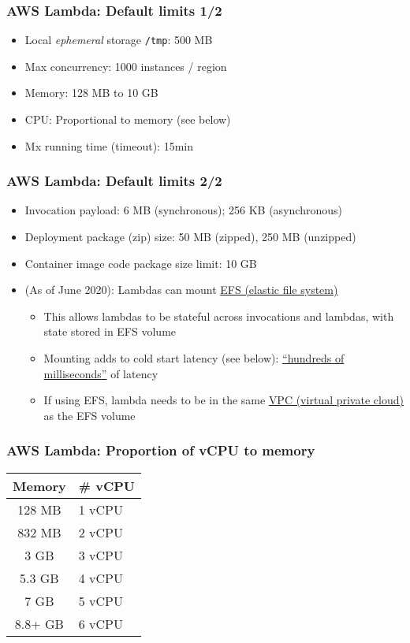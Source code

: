 \documentclass[11pt,aspectratio=169]{beamer}
\begin{document}
\begin{nrcanFrame}
  \frametitle{AWS Lambda: Default limits 1/2}
  \begin{itemize}
  \item Local \textit{ephemeral} storage \texttt{/tmp}: 500 MB 
  \item Max concurrency: 1000 instances / region
  \item Memory: 128 MB to 10 GB
  \item CPU: Proportional to memory (see below)
  \item Mx running time (timeout): 15min
  \end{itemize}
\end{nrcanFrame}




\begin{nrcanFrame}
  \frametitle{AWS Lambda: Default limits 2/2}
  \begin{itemize}
  \item Invocation payload: 6 MB (synchronous); 256 KB (asynchronous)
  \item Deployment package (zip) size: 50 MB (zipped), 250 MB (unzipped)
  \item Container image code package size limit: 10 GB
  \item (As of June 2020): Lambdas can mount \href{https://aws.amazon.com/efs/}{EFS (elastic file system)}
    \begin{itemize}
    \item This allows lambdas to be stateful across invocations and lambdas, with state stored in EFS volume
    \item Mounting adds to cold start latency (see below):
      \href{https://aws.amazon.com/blogs/compute/using-amazon-efs-for-aws-lambda-in-your-serverless-applications/}{``hundreds
        of milliseconds''} of latency
    \item If using EFS, lambda needs to be in the same
      \href{https://aws.amazon.com/vpc/}{VPC (virtual private cloud)} as the EFS volume
    \end{itemize}
  \end{itemize}
\end{nrcanFrame}


\begin{nrcanFrame}
  \frametitle{AWS Lambda: Proportion of vCPU to memory}
  \centering
  \begin{table}
  \begin{tabular}{|c||l|}
    \hline    \hline
    \bf Memory & \# \bf vCPU \\  \hline
    128 MB & 1 vCPU \\ \hline
  832 MB & 2 vCPU \\ \hline
  3 GB & 3 vCPU \\ \hline
  5.3 GB & 4 vCPU \\ \hline
  7 GB & 5 vCPU \\ \hline
  8.8+ GB & 6 vCPU \\
      \hline    \hline
  \end{tabular}
  \end{table}
\end{nrcanFrame}
\end{document}
